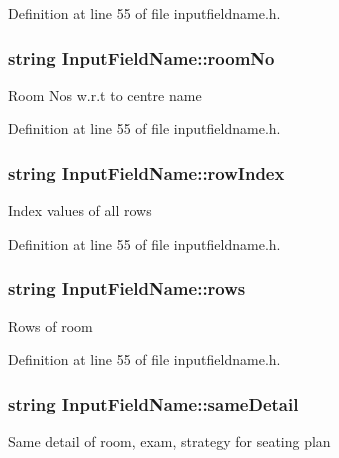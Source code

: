 Definition at line 55 of file inputfieldname.\-h.

\hypertarget{classInputFieldName_abb6b245e03e76aa29d7ef8733298e72f}{
\subsubsection[{room\-No}]{\setlength{\rightskip}{0pt plus 5cm}string Input\-Field\-Name\-::room\-No}}\label{classInputFieldName_abb6b245e03e76aa29d7ef8733298e72f}
Room Nos w.\-r.\-t to centre name 

Definition at line 55 of file inputfieldname.\-h.

\hypertarget{classInputFieldName_adfb1d136313267eecabe30391a03b49b}{
\subsubsection[{row\-Index}]{\setlength{\rightskip}{0pt plus 5cm}string Input\-Field\-Name\-::row\-Index}}\label{classInputFieldName_adfb1d136313267eecabe30391a03b49b}
Index values of all rows 

Definition at line 55 of file inputfieldname.\-h.

\hypertarget{classInputFieldName_a1b5a819437f52b4bb6b0ea59f542f9a9}{
\subsubsection[{rows}]{\setlength{\rightskip}{0pt plus 5cm}string Input\-Field\-Name\-::rows}}\label{classInputFieldName_a1b5a819437f52b4bb6b0ea59f542f9a9}
Rows of room 

Definition at line 55 of file inputfieldname.\-h.

\hypertarget{classInputFieldName_a6de91205e7eac3168e17d100ab4d8e64}{
\subsubsection[{same\-Detail}]{\setlength{\rightskip}{0pt plus 5cm}string Input\-Field\-Name\-::same\-Detail}}\label{classInputFieldName_a6de91205e7eac3168e17d100ab4d8e64}
Same detail of room, exam, strategy for seating plan 

